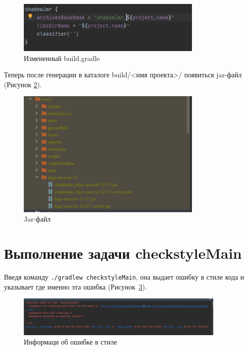 \begin{figure}[h!tp]
	\centering
	\includegraphics[width=0.8\textwidth]{png_7}
	\caption{Измененный build.gradle}
	\label{fig:jar:rename}
\end{figure}

Теперь после генерации в каталоге build/<имя проекта>/ появиться jar-файл
(Рисунок \ref{fig:jar:file}).

\begin{figure}[h!tp]
	\centering
	\includegraphics[width=0.8\textwidth]{png_8}
	\caption{Jar-файл}
	\label{fig:jar:file}
\end{figure}

\section{Выполнение задачи checkstyleMain}
Введя команду \texttt{./gradlew checkstyleMain}, она выдает ошибку в
стиле кода и указывает где именно эта ошибка
(Рисунок~\ref{fig:gradle:checkstyleMain}).

\begin{figure}[h!tp]
	\centering
	\includegraphics[width=0.9\textwidth]{png_10}
	\caption{Информаци об ошибке в стиле}
	\label{fig:gradle:checkstyleMain}
\end{figure}

